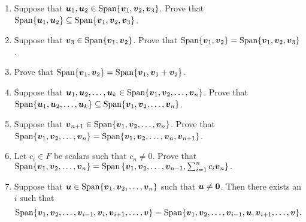 \begin{enumerate}[!HW!]
\itemspade For any list of vectors $\bb v_1,\ldots, \bb v_n$ in $F^m$, show that $\Span\{\bb v_1,\ldots, \bb v_n\}$ contains the zero vector.

\item Suppose that $\bb u_1, \bb u_2\in \Span\{\bb v_1, \bb v_2,\bb v_3\}$. Prove that $\Span\{\bb u_1, \bb u_2\}\subseteq \Span\{\bb v_1, \bb v_2, \bb v_3\}$.

\item Suppose that $\bb v_3 \in \Span\{\bb v_1, \bb v_2\}$. Prove that $\Span\{\bb v_1, \bb v_2\} = \Span\{\bb v_1, \bb v_2, \bb v_3\}$.

\item Prove that $\Span\{\bb v_1, \bb v_2\}=\Span\{\bb v_1, \bb v_1+\bb v_2\}$.

\item Suppose that $\bb u_1, \bb u_2,\ldots, \bb u _k\in \Span\{\bb v_1, \bb v_2, \ldots, \bb v_n\}$. Prove that $\Span\{\bb u_1, \bb u_2, \ldots, \bb u_k\}\subseteq \Span\{\bb v_1, \bb v_2,\ldots,  \bb v_n\}$.

\item Suppose that $\bb v_{n+1} \in \Span\{\bb v_1, \bb v_2,\ldots, \bb v_n\}$. Prove that $\Span\{\bb v_1, \bb v_2, \ldots, \bb v_n\} = \Span\{\bb v_1, \bb v_2, \ldots, \bb v_n, \bb v_{n+1}\}$.

\item \label{hw:changespanner} Let $c_i\in F$ be scalars such that $c_n\neq 0$. Prove that $\Span\{\bb v_1, \bb v_2, \ldots, \bb v_n\} = \Span\left\{\bb v_1, \bb v_2, \ldots, \bb v_{n-1}, \sum_{i=1}^n c_i\bb v_n\right\}.$

\item \label{hw:changespanner2}Suppose that $\bb u\in \Span\{\bb v_1, \bb v_2, \ldots, \bb v_n\}$ such that $\bb u\neq \bb 0$. Then there exists an $i$ such that \[\Span\{\bb v_1, \bb v_2,\ldots, \bb v_{i-1}, \bb v_i, \bb v_{i+1}, \ldots, \bb v\} = \Span\{\bb v_1, \bb v_2,\ldots, \bb v_{i-1}, \bb u, \bb v_{i+1}, \ldots, \bb v\}.\]
\end{enumerate}

\pagebreak